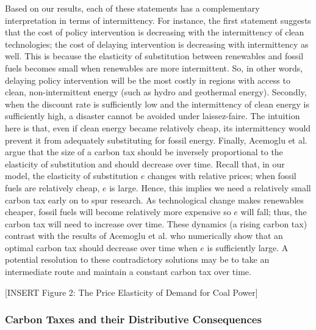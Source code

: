 \documentclass[11pt,a4paper,leqno]{extarticle}
\begin{document}
	Based on our results, each of these statements has a complementary interpretation in terms of intermittency. For instance, the first statement suggests that the cost of policy intervention is decreasing with the intermittency of clean technologies; the cost of delaying intervention is decreasing with intermittency as well. This is because the elasticity of substitution between renewables and fossil fuels becomes small when renewables are more intermittent.  So, in other words, delaying policy intervention will be the most costly in regions with access to clean, non-intermittent energy (such as hydro and geothermal energy). Secondly,  when the discount rate is sufficiently low and the intermittency of clean energy is sufficiently high, a disaster cannot be avoided under laissez-faire. The intuition here is that, even if clean energy became relatively cheap, its intermittency would prevent it from adequately substituting for fossil energy. Finally, Acemoglu et al. argue that the size of a carbon tax should be inversely proportional to the elasticity of substitution and should decrease over time. Recall that, in our model, the elasticity of substitution $e$ changes with relative prices; when fossil fuels are relatively cheap, $e$ is large. Hence, this implies we need a relatively small carbon tax early on to spur research. As technological change makes renewables cheaper, fossil fuels will become relatively more expensive so $e$ will fall; thus, the carbon tax will need to increase over time. These dynamics (a rising carbon tax) contrast with the results of Acemoglu et al. who numerically show that an optimal carbon tax should decrease over time when $e$ is sufficiently large. A potential resolution to these contradictory solutions may be to take an intermediate route and maintain a constant carbon tax over time. 
	
	
	\vspace{0.15in}
	\begin{center}
		[INSERT Figure 2: The Price Elasticity of Demand for Coal Power]
	\end{center}
	\vspace{0.15in}
	
	
	
	
	\subsubsection{Carbon Taxes and their Distributive Consequences}
	
\end{document}
